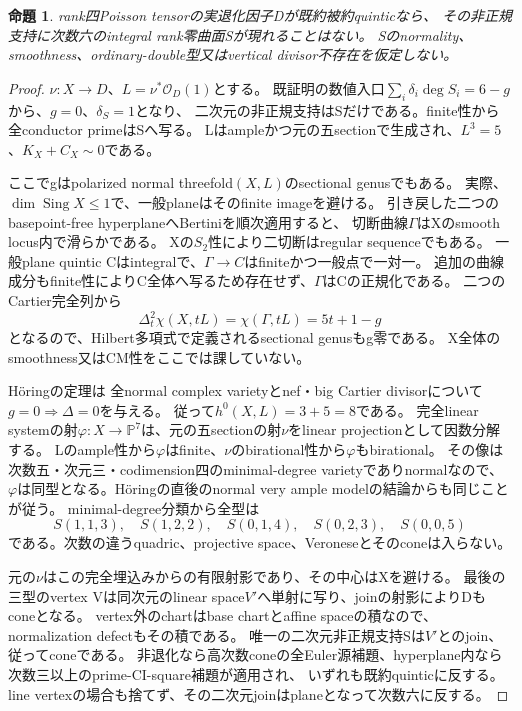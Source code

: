 \documentclass[a4paper,11pt]{ltjsarticle}
\newtheorem{proposition}{命題}[section]
\theoremstyle{definition}
\begin{document}
\begin{proposition}\label{prop:degree-six-rank-zero-all}
rank四Poisson tensorの実退化因子Dが既約被約quinticなら、
その非正規支持に次数六のintegral rank零曲面Sが現れることはない。
Sのnormality、smoothness、ordinary-double型又はvertical divisor不存在を仮定しない。
\end{proposition}
\begin{proof}
$\nu:X\to D$、$L=\nu^*\mathcal O_D(1)$とする。
既証明の数値入口$\sum_i\delta_i\deg S_i=6-g$から、$g=0$、$\delta_S=1$となり、
二次元の非正規支持はSだけである。finite性から全conductor primeはSへ写る。
Lはampleかつ元の五sectionで生成され、$L^3=5$、$K_X+C_X\sim0$である。

ここでgはpolarized normal threefold$(X,L)$のsectional genusでもある。
実際、$\dim\operatorname{Sing}X\le1$で、一般planeはそのfinite imageを避ける。
引き戻した二つのbasepoint-free hyperplaneへBertiniを順次適用すると、
切断曲線$\Gamma$はXのsmooth locus内で滑らかである。
Xの$S_2$性により二切断はregular sequenceでもある。
一般plane quintic Cはintegralで、$\Gamma\to C$はfiniteかつ一般点で一対一。
追加の曲線成分もfinite性によりC全体へ写るため存在せず、$\Gamma$はCの正規化である。
二つのCartier完全列から
\[
 \Delta_t^2\chi(X,tL)=\chi(\Gamma,tL)=5t+1-g
\]
となるので、Hilbert多項式で定義されるsectional genusもg零である。
X全体のsmoothness又はCM性をここでは課していない。

Höringの定理\cite[Theorem 1.2及び直後, p.2]{horingsectional}は
全normal complex varietyとnef・big Cartier divisorについて$g=0\Rightarrow\Delta=0$を与える。
従って$h^0(X,L)=3+5=8$である。
完全linear systemの射$\varphi:X\to\mathbb P^7$は、元の五sectionの射$\nu$をlinear projectionとして因数分解する。
Lのample性から$\varphi$はfinite、$\nu$のbirational性から$\varphi$もbirational。
その像は次数五・次元三・codimension四のminimal-degree varietyでありnormalなので、
$\varphi$は同型となる。Höringの直後のnormal very ample modelの結論からも同じことが従う。
minimal-degree分類\cite[Notation and Remark 2.1, p.4]{brodmannpark}から全型は
\[
 S(1,1,3),\quad S(1,2,2),\quad S(0,1,4),\quad S(0,2,3),\quad S(0,0,5)
\]
である。次数の違うquadric、projective space、Veroneseとそのconeは入らない。

元の$\nu$はこの完全埋込みからの有限射影であり、その中心はXを避ける。
最後の三型のvertex Vは同次元のlinear space$V'$へ単射に写り、joinの射影によりDもconeとなる。
vertex外のchartはbase chartとaffine spaceの積なので、normalization defectもその積である。
唯一の二次元非正規支持Sは$V'$とのjoin、従ってconeである。
非退化なら高次数coneの全Euler源補題、hyperplane内なら次数三以上のprime-CI-square補題が適用され、
いずれも既約quinticに反する。line vertexの場合も捨てず、その二次元joinはplaneとなって次数六に反する。


\end{proof}
\end{document}
